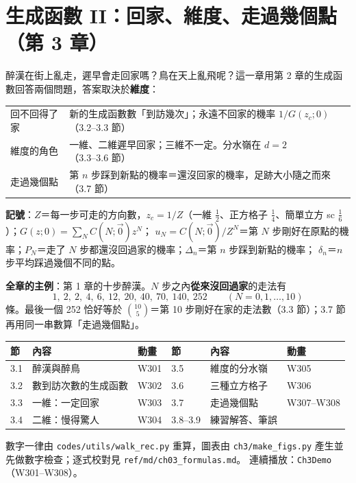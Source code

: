 

\section{生成函數 II：回家、維度、走過幾個點（第 3 章）}

\begin{keybox}[先看這裡]
醉漢在街上亂走，遲早會走回家嗎？鳥在天上亂飛呢？這一章用第 2 章的生成函數回答兩個問題，答案取決於\textbf{維度}：
\begin{center}
\small
\begin{tabular}{@{}ll@{}}
回不回得了家 & 新的生成函數數「到訪幾次」；永遠不回家的機率 $1/G(z_c;0)$（3.2--3.3 節）\\
維度的角色 & 一維、二維遲早回家；三維不一定。分水嶺在 $d=2$（3.3--3.6 節）\\
走過幾個點 & 第 $n$ 步踩到新點的機率＝還沒回家的機率，足跡大小隨之而來（3.7 節）
\end{tabular}
\end{center}
\textbf{記號}：$Z$＝每一步可走的方向數，$z_c=1/Z$（一維 $\frac12$、正方格子 $\frac14$、簡單立方 sc $\frac16$）；$G(z;0)=\sum_NC(N;\vec0)z^N$；
$u_N=C(N;\vec0)/Z^N$＝第 $N$ 步剛好在原點的機率；$P_N$＝走了 $N$ 步都還沒回過家的機率；$\Delta_n$＝第 $n$ 步踩到新點的機率；
$\delta_n$＝$n$ 步平均踩過幾個不同的點。

\textbf{全章的主例}：第 1 章的十步醉漢。$N$ 步之內\textbf{從來沒回過家}的走法有
\[1,\ 2,\ 2,\ 4,\ 6,\ 12,\ 20,\ 40,\ 70,\ 140,\ 252\qquad(N=0,1,\dots,10)\]
條。最後一個 252 恰好等於 $\binom{10}{5}$＝第 10 步剛好在家的走法數（3.3 節）；3.7 節再用同一串數算「走過幾個點」。
\begin{center}
\small
\begin{tabular}{@{}lll@{\qquad}lll@{}}
\toprule
節 & 內容 & 動畫 & 節 & 內容 & 動畫\\
\midrule
3.1 & 醉漢與醉鳥 & W301 & 3.5 & 維度的分水嶺 & W305\\
3.2 & 數到訪次數的生成函數 & W302 & 3.6 & 三種立方格子 & W306\\
3.3 & 一維：一定回家 & W303 & 3.7 & 走過幾個點 & W307--W308\\
3.4 & 二維：慢得驚人 & W304 & 3.8--3.9 & 練習解答、筆誤 & \\
\bottomrule
\end{tabular}
\end{center}
數字一律由 \texttt{codes/utils/walk\_rec.py} 重算，圖表由 \texttt{ch3/make\_figs.py} 產生並先做數字檢查；逐式校對見 \texttt{ref/md/ch03\_formulas.md}。
連續播放：\texttt{Ch3Demo}（W301--W308）。
\end{keybox}

